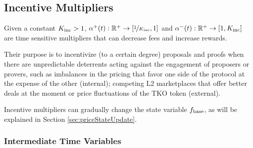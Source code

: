 

\subsection{Incentive Multipliers}
\label{sec:incentive_mult}
Given a constant $K_\textnormal{inc} > 1$,
$\alpha^+(t): \mathbb{R}^+\rightarrow [ \nicefrac{1}{K_\textnormal{inc}},1]$ and $\alpha^-(t): \mathbb{R}^+\rightarrow [1, K_\textnormal{inc}] $ are time sensitive multipliers that can decrease fees and increase rewards.

Their purpose is to incentivize (to a certain degree) proposals and proofs when there are unpredictable deterrents acting against the engagement of proposers or provers, such as imbalances in the pricing that favor one side of the protocol at the expense of the other (internal);  competing L2 marketplaces that offer better deals at the moment or price fluctuations of the TKO token (external).

Incentive multipliers can gradually change the state variable $f_\textnormal{base}$, as will be explained in Section \ref{sec:priceStateUpdate}.

\subsubsection{Intermediate Time Variables}
\label{sec:intermediateTimeVar}

